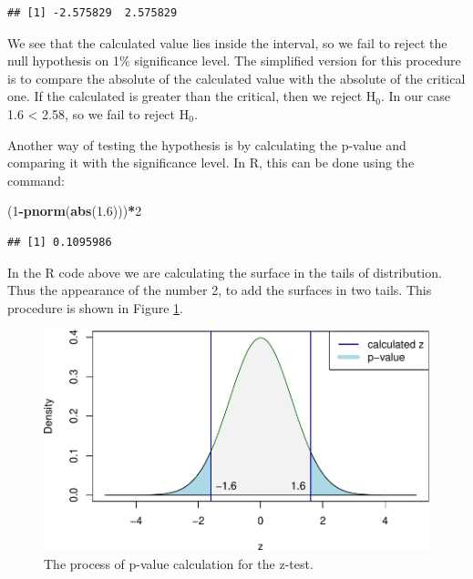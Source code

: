 \documentclass[
]{book}
\newenvironment{Shaded}{\begin{snugshade}}{\end{snugshade}}
\newcommand{\DecValTok}[1]{\textcolor[rgb]{0.00,0.00,0.81}{#1}}
\newcommand{\FloatTok}[1]{\textcolor[rgb]{0.00,0.00,0.81}{#1}}
\newcommand{\FunctionTok}[1]{\textcolor[rgb]{0.13,0.29,0.53}{\textbf{#1}}}
\newcommand{\NormalTok}[1]{#1}
\newcommand{\SpecialCharTok}[1]{\textcolor[rgb]{0.81,0.36,0.00}{\textbf{#1}}}
\theoremstyle{definition}
\theoremstyle{definition}
\theoremstyle{definition}
\theoremstyle{definition}
\theoremstyle{remark}
\begin{document}
\begin{verbatim}
## [1] -2.575829  2.575829
\end{verbatim}

We see that the calculated value lies inside the interval, so we fail to reject the null hypothesis on 1\% significance level. The simplified version for this procedure is to compare the absolute of the calculated value with the absolute of the critical one. If the calculated is greater than the critical, then we reject H\(_0\). In our case 1.6 \textless{} 2.58, so we fail to reject H\(_0\).

Another way of testing the hypothesis is by calculating the p-value and comparing it with the significance level. In R, this can be done using the command:

\begin{Shaded}
\begin{Highlighting}[]
\NormalTok{(}\DecValTok{1}\SpecialCharTok{{-}}\FunctionTok{pnorm}\NormalTok{(}\FunctionTok{abs}\NormalTok{(}\FloatTok{1.6}\NormalTok{)))}\SpecialCharTok{*}\DecValTok{2}
\end{Highlighting}
\end{Shaded}

\begin{verbatim}
## [1] 0.1095986
\end{verbatim}

In the R code above we are calculating the surface in the tails of distribution. Thus the appearance of the number 2, to add the surfaces in two tails. This procedure is shown in Figure \ref{fig:hypothesisTestingZTestPvalue}.

\begin{figure}
\centering
\includegraphics{Svetunkov---Statistics-for-Business-Analytics_files/figure-latex/hypothesisTestingZTestPvalue-1.pdf}
\caption{\label{fig:hypothesisTestingZTestPvalue}The process of p-value calculation for the z-test.}
\end{figure}
\end{document}
